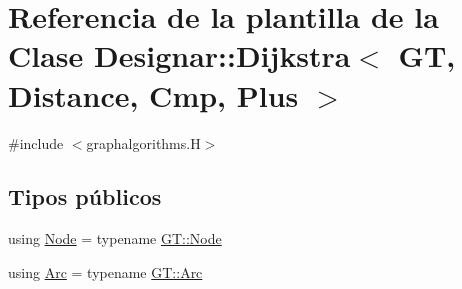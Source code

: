 \hypertarget{class_designar_1_1_dijkstra}{}\section{Referencia de la plantilla de la Clase Designar\+:\+:Dijkstra$<$ GT, Distance, Cmp, Plus $>$}
\label{class_designar_1_1_dijkstra}


{\ttfamily \#include $<$graphalgorithms.\+H$>$}

\subsection*{Tipos públicos}
\begin{DoxyCompactItemize}
\item 
using \hyperlink{class_designar_1_1_dijkstra_afeb644fc5395569ec366f0d220ab477d}{Node} = typename \hyperlink{class_designar_1_1_graph_a5dfc7dba9d092ac489c72e40390c37d0}{G\+T\+::\+Node}
\item 
using \hyperlink{class_designar_1_1_dijkstra_a5f0682f4edfd1456b7d4432fa976c641}{Arc} = typename \hyperlink{class_designar_1_1_graph_a74c730ef4ce2d20f998d72bd25c2b5bf}{G\+T\+::\+Arc}
\end{DoxyCompactItemize}
